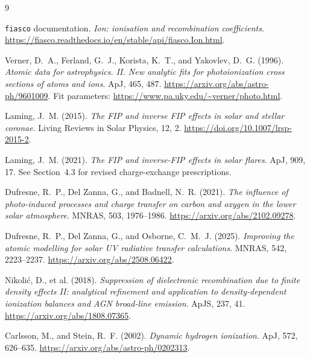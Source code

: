 \documentclass[a4paper,10pt,twoside,openany]{book}
\newcommand{\ChapColor}{Cap1Blue}
\newcommand{\ChapColorLight}{LightBlue}
\newcommand{\setChapColor}[2]{%
  \renewcommand{\ChapColor}{#1}%
  \renewcommand{\ChapColorLight}{#2}}
\begin{document}
\backmatter
\setChapColor{Cap1Blue}{LightBlue}
\begin{thebibliography}{9}

\texttt{fiasco} documentation.
\emph{Ion: ionisation and recombination coefficients}.
\url{https://fiasco.readthedocs.io/en/stable/api/fiasco.Ion.html}.

Verner, D.~A., Ferland, G.~J., Korista, K.~T., and Yakovlev, D.~G. (1996).
\emph{Atomic data for astrophysics. II. New analytic fits for photoionization
cross sections of atoms and ions}.
ApJ, 465, 487.
\url{https://arxiv.org/abs/astro-ph/9601009}.
Fit parameters: \url{https://www.pa.uky.edu/~verner/photo.html}.

Laming, J.~M. (2015).
\emph{The FIP and inverse FIP effects in solar and stellar coronae}.
Living Reviews in Solar Physics, 12, 2.
\url{https://doi.org/10.1007/lrsp-2015-2}.

Laming, J.~M. (2021).
\emph{The FIP and inverse-FIP effects in solar flares}.
ApJ, 909, 17. See Section~4.3 for revised charge-exchange prescriptions.

Dufresne, R.~P., Del Zanna, G., and Badnell, N.~R. (2021).
\emph{The influence of photo-induced processes and charge transfer on carbon
and oxygen in the lower solar atmosphere}.
MNRAS, 503, 1976--1986.
\url{https://arxiv.org/abs/2102.09278}.

Dufresne, R.~P., Del Zanna, G., and Osborne, C.~M.~J. (2025).
\emph{Improving the atomic modelling for solar UV radiative transfer
calculations}.
MNRAS, 542, 2223--2237.
\url{https://arxiv.org/abs/2508.06422}.

Nikoli\'c, D., et al. (2018).
\emph{Suppression of dielectronic recombination due to finite density effects
II: analytical refinement and application to density-dependent ionization
balances and AGN broad-line emission}.
ApJS, 237, 41.
\url{https://arxiv.org/abs/1808.07365}.

Carlsson, M., and Stein, R.~F. (2002).
\emph{Dynamic hydrogen ionization}.
ApJ, 572, 626--635.
\url{https://arxiv.org/abs/astro-ph/0202313}.

\end{thebibliography}
\end{document}
